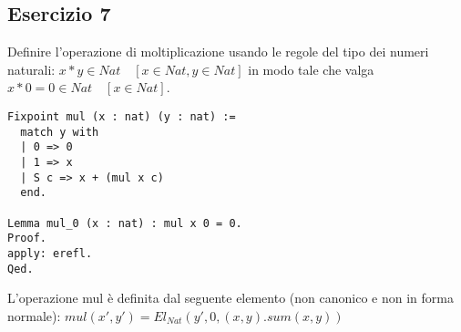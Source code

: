 \subsection{Esercizio 7}

Definire l'operazione di moltiplicazione usando le regole del tipo dei numeri 
naturali: $x*y \in Nat \quad [x \in Nat, y \in Nat]$
in modo tale che valga $x*0 = 0 \in Nat \quad [x \in Nat]$.

\begin{lstlisting}[language=Coq]
Fixpoint mul (x : nat) (y : nat) :=
  match y with
  | 0 => 0
  | 1 => x
  | S c => x + (mul x c)
  end.

Lemma mul_0 (x : nat) : mul x 0 = 0.
Proof.
apply: erefl.
Qed.
\end{lstlisting}

L'operazione mul è definita dal seguente elemento (non canonico e non in
forma normale): $mul(x',y') = El_{Nat}(y',0,(x,y).sum(x,y))$
